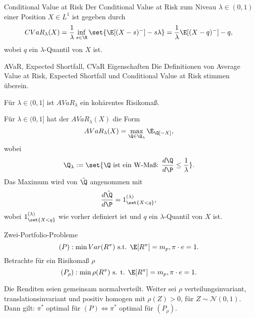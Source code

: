 \begin{karte}{Conditional Value at Risk}
Der Conditional Value at Risk zum Niveau \(\lambda \in (0,1)\) einer Position \(X\in L^1\)
ist gegeben durch 
\[ CVaR_\lambda(X) = \frac{1}{\lambda} \inf_{s\in \R} \set{ \E[(X-s)^-] - s\lambda } = \frac{1}{\lambda} \E[(X-q)^-] - q, \]
wobei \(q\) ein \(\lambda\)-Quantil von \(X\) ist.
\end{karte}

\begin{karte}{AVaR, Expected Shortfall, CVaR Eigenschaften}
Die Definitionen von Average Value at Risk, Expected Shortfall und Conditional Value at Risk stimmen überein.

Für \(\lambda\in (0,1]\) ist \(AVaR_\lambda\) ein kohärentes Risikomaß.

Für \(\lambda \in (0,1]\) hat der \(AVaR_\lambda(X)\) die Form 
\[ AVaR_\lambda(X) = \max_{\Q\in \Q_\lambda} \E_\Q[-X], \]
wobei 
\[ \Q_\lambda := \set{\Q \text{ ist ein W-Maß: }\frac{d\Q}{d\P} \leq \frac{1}{\lambda}}. \]
Das Maximum wird von \(\tilde{\Q}\) angenommen mit 
\[ \frac{d\tilde{\Q}}{d\P} = 1_{\set{X < q}}^{(\lambda)}, \]
wobei \(1_{\set{X < q}}^{(\lambda)}\) wie vorher definiert ist und \(q\) ein 
\(\lambda\)-Quantil von \(X\) ist.
\end{karte}

\begin{karte}{Zwei-Portfolio-Probleme}
\[(P): \min Var(R^\pi) \text{ s.t. } \E[R^\pi] = m_p, \pi \cdot e = 1. \]
Betrachte für ein Risikomaß \(\rho\)
\[ (P_\rho): \min \rho(R^\pi) \text{ s. t. } \E[R^\pi] = m_p, \pi \cdot e = 1. \]

Die Renditen seien gemeinsam normalverteilt. Weiter sei \(\rho\) verteilungsinvariant, 
translationsinvariant und positiv homogen mit \(\rho(Z) > 0\), für \(Z \sim \mathcal{N}(0,1)\). 
Dann gilt: \(\pi^*\) optimal für \((P) \Leftrightarrow \pi^*\) optimal für \((P_\rho)\).
\end{karte}